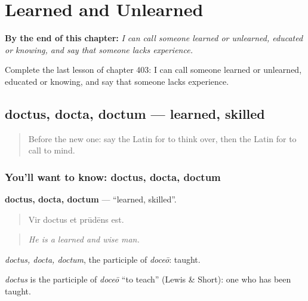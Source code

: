 
\chapter{Learned and Unlearned}
\label{ch:la-learned-and-unlearned}

\begin{chapteropening}
\textbf{By the end of this chapter:} \emph{I can call someone learned or unlearned, educated or knowing, and say that someone lacks experience.}

Complete the last lesson of chapter 403: I can call someone learned or unlearned, educated or knowing, and say that someone lacks experience.
\end{chapteropening}

\section[doctus, docta, doctum]{doctus, docta, doctum — learned, skilled}

\label{lesson:LA-C403-doctus}



\begin{quote}
Before the new one: say the Latin for to think over, then the Latin for to call to mind.
\end{quote}

\subsection*{You'll want to know: doctus, docta, doctum}
\textbf{doctus, docta, doctum} — \textquotedblleft{}learned, skilled\textquotedblright{}.

\begin{quote}
Vir doctus et prūdēns est.
\end{quote}

\begin{quote}
\emph{He is a learned and wise man.}
\end{quote}

\emph{doctus, docta, doctum}, the participle of \emph{doceō}: taught.

\begin{cousinweb}
\emph{doctus} is the participle of \emph{doceō} \textquotedblleft{}to teach\textquotedblright{} (Lewis \& Short): one who has been taught.
\end{cousinweb}

